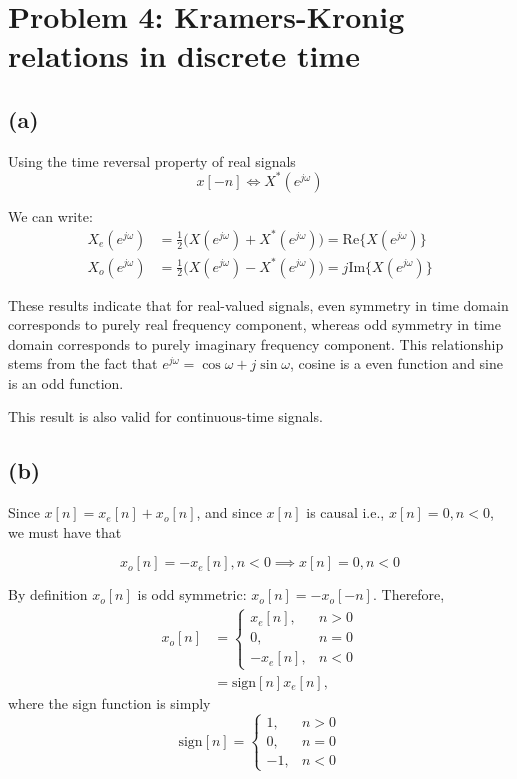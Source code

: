 \documentclass{article}
\begin{document}
\section{Problem 4: Kramers-Kronig relations in discrete time}
\subsection{(a)}

Using the time reversal property of real signals
\begin{equation}
x[-n] \Longleftrightarrow X^*(e^{j\omega}) \tag{time reversal of real signals}
\end{equation}

We can write:
\begin{align}
	X_e(e^{j\omega}) &= \frac{1}{2}\Big(X(e^{j\omega}) + X^*(e^{j\omega})\Big) = \mathrm{Re}\{X(e^{j\omega})\} \\
	X_o(e^{j\omega}) &= \frac{1}{2}\Big(X(e^{j\omega}) - X^*(e^{j\omega})\Big) = j\mathrm{Im}\{X(e^{j\omega})\} 
\end{align}

These results indicate that for real-valued signals, even symmetry in time domain corresponds to purely real frequency component, whereas odd symmetry in time domain corresponds to purely imaginary frequency component. This relationship stems from the fact that $e^{j\omega} = \cos\omega + j\sin\omega$, cosine is a even function and sine is an odd function.

This result is also valid for continuous-time signals.
\subsection{(b)}

Since $x[n] = x_e[n] + x_o[n]$, and since $x[n]$ is causal i.e., $x[n] = 0, n < 0$, we must have that

\begin{equation}
x_o[n] = -x_e[n], n < 0 \implies x[n] = 0, n < 0
\end{equation}

By definition $x_o[n]$ is odd symmetric: $x_o[n] = -x_o[-n]$. Therefore,
\begin{align} \nonumber
x_o[n] &= \begin{cases}
x_e[n], &n > 0 \\
0, & n = 0 \\
-x_e[n], &n < 0
\end{cases} \\
&= \mathrm{sign}[n]x_e[n],
\end{align}
where the sign function is simply
\begin{equation}
\mathrm{sign}[n] = \begin{cases}
1, &n > 0 \\
0, & n = 0 \\
-1, & n < 0
\end{cases}
\end{equation}
\end{document}
